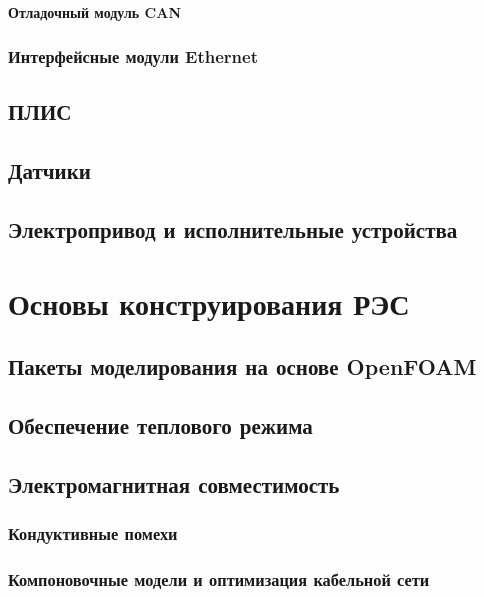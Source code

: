 \subsection{Отладочный модуль CAN}

\section{Интерфейсные модули Ethernet}

\chapter{ПЛИС}

\chapter{Датчики}

\chapter{Электропривод и исполнительные устройства}

\part{Основы конструирования РЭС}

\chapter{Пакеты моделирования на основе OpenFOAM}

\chapter{Обеспечение теплового режима}

\chapter{Электромагнитная совместимость}

\section{Кондуктивные помехи}

\section{Компоновочные модели и оптимизация кабельной сети}

